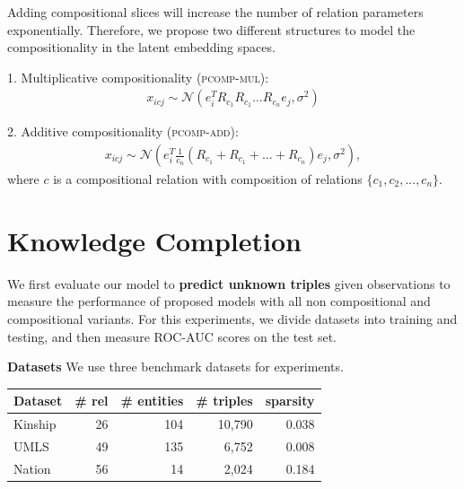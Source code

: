 \documentclass[a0,landscape]{a0poster}
\begin{document}
\begin{multicols}{3}
Adding compositional slices will increase the number of relation parameters exponentially. Therefore, we propose two different structures to model the compositionality in the latent embedding spaces.

1. Multiplicative compositionality (\textsc{pcomp-mul}):
\begin{align}
x_{icj} \sim \mathcal{N}(e_i^T R_{c_1} R_{c_1} \dots R_{c_n} e_j,\sigma^2)
\end{align}

2. Additive compositionality (\textsc{pcomp-add}):
\begin{align}
x_{icj} \sim \mathcal{N}(e_i^T \frac{1}{c_n} (R_{c_1} + R_{c_1} + \dots + R_{c_n}) e_j,\sigma^2),
\end{align}
where $c$ is a compositional relation with composition of relations $\{c_1, c_2, ..., c_n\}$.


\section{Knowledge Completion}

We first evaluate our model to \textbf{predict unknown triples} given observations to measure the performance of proposed models with all non compositional and compositional variants. For this experiments, we divide datasets into training and testing, and then measure ROC-AUC scores on the test set.

\vspace{.5cm}

\noindent\textbf{Datasets}
We use three benchmark datasets for experiments.
\begin{center}
\begin{tabular}{l | r | r | r | r}
Dataset &  \# rel & \# entities & \# triples & sparsity \\ \hline
Kinship & 26 & 104  & 10,790 & 0.038 \\
UMLS & 49 &135  & 6,752 & 0.008 \\
Nation & 56 & 14  & 2,024 & 0.184 \\
\end{tabular}
\end{center}


\vspace{.5cm}


\end{multicols}
\end{document}
